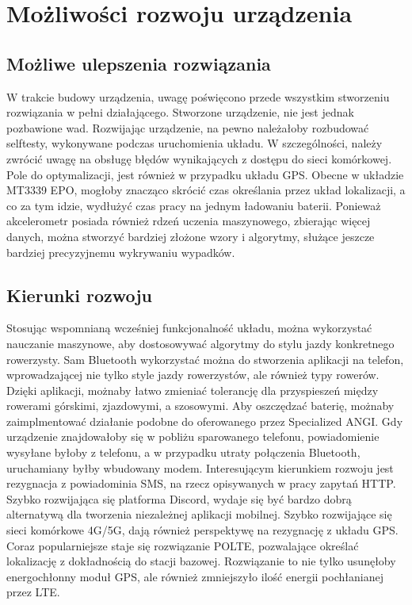 \chapter{Możliwości rozwoju urządzenia}
\section{Możliwe ulepszenia rozwiązania}
W trakcie budowy urządzenia, uwagę poświęcono przede wszystkim stworzeniu rozwiązania w pełni działającego. Stworzone urządzenie, nie jest jednak pozbawione wad. Rozwijając urządzenie, na pewno należałoby rozbudować selftesty, wykonywane podczas uruchomienia układu. W szczególności, należy zwrócić uwagę na obsługę błędów wynikających z dostępu do sieci komórkowej. Pole do optymalizacji, jest również w przypadku układu GPS. Obecne w układzie MT3339 EPO, mogłoby znacząco skrócić czas określania przez układ lokalizacji, a co za tym idzie, wydłużyć czas pracy na jednym ładowaniu baterii.
\newline
Ponieważ akcelerometr posiada również rdzeń uczenia maszynowego, zbierając więcej danych, można stworzyć bardziej złożone wzory i algorytmy, służące jeszcze bardziej precyzyjnemu wykrywaniu wypadków.
\section{Kierunki rozwoju}
Stosując wspomnianą wcześniej funkcjonalność układu, można wykorzystać nauczanie maszynowe, aby dostosowywać algorytmy do stylu jazdy konkretnego rowerzysty. Sam Bluetooth wykorzystać można do stworzenia aplikacji na telefon, wprowadzającej nie tylko style jazdy rowerzystów, ale również typy rowerów. Dzięki aplikacji, możnaby łatwo zmieniać tolerancję dla przyspieszeń między rowerami górskimi, zjazdowymi, a szosowymi. Aby oszczędzać baterię, możnaby zaimplmentować działanie podobne do oferowanego przez Specialized ANGI. Gdy urządzenie znajdowałoby się w pobliżu sparowanego telefonu, powiadomienie wysyłane byłoby z telefonu, a w przypadku utraty połączenia Bluetooth, uruchamiany byłby wbudowany modem.
\newline
Interesującym kierunkiem rozwoju jest rezygnacja z powiadominia SMS, na rzecz opisywanych w pracy zapytań HTTP. Szybko rozwijająca się platforma Discord, wydaje się być bardzo dobrą alternatywą dla tworzenia niezależnej aplikacji mobilnej.
\newline
Szybko rozwijające się sieci komórkowe 4G/5G, dają również perspektywę na rezygnację z układu GPS. Coraz popularniejsze staje się rozwiązanie POLTE\cite{polte}, pozwalające określać lokalizację z dokładnością do stacji bazowej. Rozwiązanie to nie tylko usunęłoby energochłonny moduł GPS, ale również zmniejszyło ilość energii pochłanianej przez LTE.
